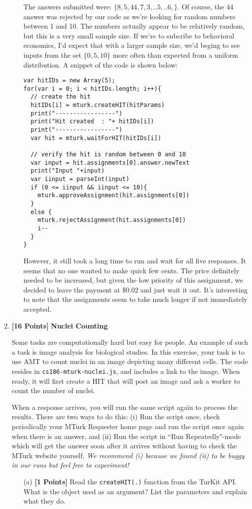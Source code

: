 \documentclass[11pt]{article}
\newcommand{\points}[1]{\textbf{[#1 Points]}}
\begin{document}
\begin{enumerate}
\begin{enumerate}
The answers submitted were: $\{8,5,44,7,3,..5,..6,\}$. Of course, the 44 answer was rejected by our code as we're looking for random numbers between 1 and 10. The numbers actually appear to be relatively random, but this is a very small sample size. If we're to subcribe to behavioral economics, I'd expect that with a larger sample size, we'd beging to see inputs from the set $\{0,5,10 \}$  more often than expected from a uniform distribution. A snippet of the code is shown below:

\begin{lstlisting}
var hitIDs = new Array(5);
for(var i = 0; i < hitIDs.length; i++){
  // create the hit
  hitIDs[i] = mturk.createHIT(hitParams)
  print("-----------------")
  print("Hit created  : "+ hitIDs[i])
  print("-----------------")
  var hit = mturk.waitForHIT(hitIDs[i])

  // verify the hit is random between 0 and 10
  var input = hit.assignments[0].answer.newText
  print("Input "+input)
  var iinput = parseInt(input)
  if (0 <= iinput && iinput <= 10){
    mturk.approveAssignment(hit.assignments[0])
  }
  else {
    mturk.rejectAssignment(hit.assignments[0])
    i--
  }
}
\end{lstlisting}
However, it still took  a long time to run and wait for all five responses. It seems that no one wanted to make quick few cents. The price definitely needed to be increased, but given the low priority of this assignment, we decided to leave the payment at $\$0.02$ and just wait it out. It's interesting to note that the assignments seem to take much longer if not immediately accepted.
\end{enumerate}
\item \points{16} {\bf Nuclei Counting}

Some tasks are computationally hard but easy for people. An example of
such a task is image analysis for biological studies.
%
In this exercise, your task is to use AMT to count nuclei in an image
depicting many different cells. The code resides in
\texttt{cs186-mturk-nuclei.js}, and includes a link to the image. When
ready, it will first create a HIT that will post an image and ask a
worker to count the number of nuclei.

When a response arrives, you will 
run the same script again to process the results. There are two ways to do this: (i) Run the script once, check periodically your MTurk Requester home page and run the script once again when there is an answer, and (ii) Run the script in ``Run Repeatedly"-mode which will get the answer soon after it arrives without 
having to check the MTurk website yourself. 
{\em We recommend (i) because we found (ii) to be buggy in our runs but feel free to experiment!}
%
\begin{enumerate}
\item[(a)] \points{1} Read the \texttt{createHIT(.)} function from the TurKit API. What is the object 
used as an argument? List the parameters and explain what they do.


\end{enumerate}
\end{enumerate}
\end{document}
